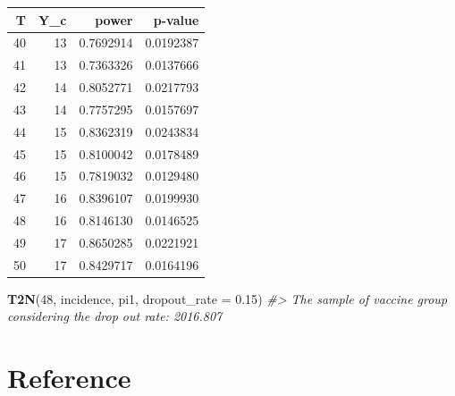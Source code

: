 \documentclass[
]{book}
\newenvironment{Shaded}{\begin{snugshade}}{\end{snugshade}}
\newcommand{\AttributeTok}[1]{\textcolor[rgb]{0.13,0.29,0.53}{#1}}
\newcommand{\CommentTok}[1]{\textcolor[rgb]{0.56,0.35,0.01}{\textit{#1}}}
\newcommand{\DecValTok}[1]{\textcolor[rgb]{0.00,0.00,0.81}{#1}}
\newcommand{\FloatTok}[1]{\textcolor[rgb]{0.00,0.00,0.81}{#1}}
\newcommand{\FunctionTok}[1]{\textcolor[rgb]{0.13,0.29,0.53}{\textbf{#1}}}
\newcommand{\NormalTok}[1]{#1}
\newcommand{\SpecialCharTok}[1]{\textcolor[rgb]{0.81,0.36,0.00}{\textbf{#1}}}
\begin{document}
\begin{tabular}[t]{r|r|r|r}
\hline
T & Y\_c & power & p-value\\
\hline
40 & 13 & 0.7692914 & 0.0192387\\
\hline
41 & 13 & 0.7363326 & 0.0137666\\
\hline
42 & 14 & 0.8052771 & 0.0217793\\
\hline
43 & 14 & 0.7757295 & 0.0157697\\
\hline
44 & 15 & 0.8362319 & 0.0243834\\
\hline
45 & 15 & 0.8100042 & 0.0178489\\
\hline
46 & 15 & 0.7819032 & 0.0129480\\
\hline
47 & 16 & 0.8396107 & 0.0199930\\
\hline
48 & 16 & 0.8146130 & 0.0146525\\
\hline
49 & 17 & 0.8650285 & 0.0221921\\
\hline
50 & 17 & 0.8429717 & 0.0164196\\
\hline
\end{tabular}

\begin{Shaded}
\end{Shaded}

\begin{Shaded}
\begin{Highlighting}[]
\FunctionTok{T2N}\NormalTok{(}\DecValTok{48}\NormalTok{, incidence, pi1, }\AttributeTok{dropout\_rate =} \FloatTok{0.15}\NormalTok{)}
\CommentTok{\#\textgreater{} The sample of vaccine group considering the drop out rate: 2016.807}
\end{Highlighting}
\end{Shaded}

\section*{Reference}\label{reference}


\end{document}
